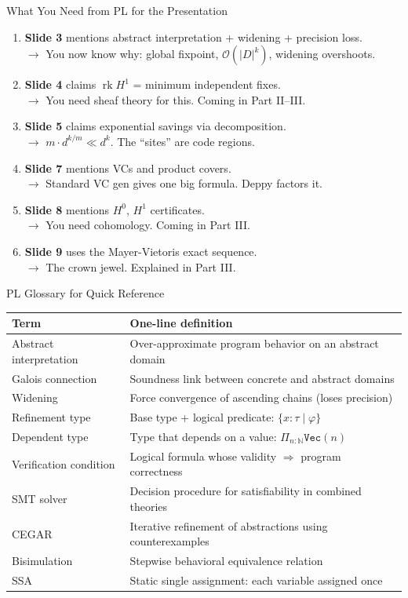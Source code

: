 \documentclass[aspectratio=169,10pt]{beamer}
\newcommand{\rk}{\operatorname{rk}}
\begin{document}
\begin{frame}{What You Need from PL for the Presentation}
\begin{enumerate}
  \item \textbf{Slide 3} mentions abstract interpretation + widening + precision loss.\\
        $\to$ You now know why: global fixpoint, $\mathcal{O}(|D|^k)$, widening overshoots.
  \item \textbf{Slide 4} claims $\rk H^1$ = minimum independent fixes.\\
        $\to$ You need sheaf theory for this. Coming in Part II--III.
  \item \textbf{Slide 5} claims exponential savings via decomposition.\\
        $\to$ $m \cdot d^{k/m} \ll d^k$. The ``sites'' are code regions.
  \item \textbf{Slide 7} mentions VCs and product covers.\\
        $\to$ Standard VC gen gives one big formula. Deppy factors it.
  \item \textbf{Slide 8} mentions $H^0$, $H^1$ certificates.\\
        $\to$ You need cohomology. Coming in Part III.
  \item \textbf{Slide 9} uses the Mayer-Vietoris exact sequence.\\
        $\to$ The crown jewel. Explained in Part III.
\end{enumerate}
\end{frame}

\begin{frame}{PL Glossary for Quick Reference}
\footnotesize
\renewcommand{\arraystretch}{1.2}
\begin{tabular}{@{}lp{9cm}@{}}
\toprule
\textbf{Term} & \textbf{One-line definition} \\
\midrule
Abstract interpretation & Over-approximate program behavior on an abstract domain \\
Galois connection & Soundness link between concrete and abstract domains \\
Widening & Force convergence of ascending chains (loses precision) \\
Refinement type & Base type + logical predicate: $\{x:\tau \mid \varphi\}$ \\
Dependent type & Type that depends on a value: $\Pi_{n:\mathbb{N}} \texttt{Vec}(n)$ \\
Verification condition & Logical formula whose validity $\Rightarrow$ program correctness \\
SMT solver & Decision procedure for satisfiability in combined theories \\
CEGAR & Iterative refinement of abstractions using counterexamples \\
Bisimulation & Stepwise behavioral equivalence relation \\
SSA & Static single assignment: each variable assigned once \\
\bottomrule
\end{tabular}
\end{frame}
\end{document}
